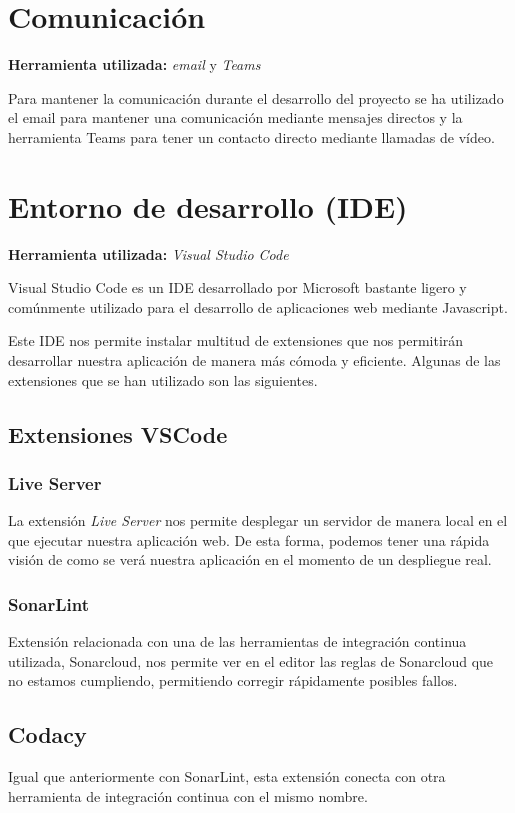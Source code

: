 \section{Comunicación}
\textbf{Herramienta utilizada: } \emph{email} y \emph{Teams}

Para mantener la comunicación durante el desarrollo del proyecto se ha utilizado el email para mantener una comunicación mediante mensajes directos y la herramienta Teams para tener un contacto directo mediante llamadas de vídeo.

\section{Entorno de desarrollo (IDE)}
\textbf{Herramienta utilizada: }\emph{Visual Studio Code}

Visual Studio Code es un IDE desarrollado por Microsoft bastante ligero y comúnmente utilizado para el desarrollo de aplicaciones web mediante Javascript. 

Este IDE nos permite instalar multitud de extensiones que nos permitirán desarrollar nuestra aplicación de manera más cómoda y eficiente. Algunas de las extensiones que se han utilizado son las siguientes.
\subsection{Extensiones VSCode}
\subsubsection{Live Server}
La extensión \emph{Live Server} nos permite desplegar un servidor de manera local en el que ejecutar nuestra aplicación web. De esta forma, podemos tener una rápida visión de como se verá nuestra aplicación en el momento de un despliegue real.

\subsubsection{SonarLint}
Extensión relacionada con una de las herramientas de integración continua utilizada, Sonarcloud, nos permite ver en el editor las reglas de Sonarcloud que no estamos cumpliendo, permitiendo corregir rápidamente posibles fallos.

\subsection{Codacy}
Igual que anteriormente con SonarLint, esta extensión conecta con otra herramienta de integración continua con el mismo nombre.

